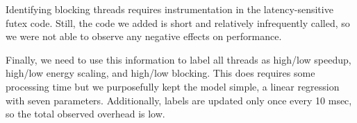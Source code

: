 Identifying blocking threads requires instrumentation in the latency-sensitive futex code. Still, the code we added is short and relatively infrequently called, so we were not able to observe any negative effects on performance. 

Finally, we need to use this information to label all threads as high/low speedup, high/low energy scaling, and high/low blocking. This does requires some processing time but we purposefully kept the model simple, a linear regression with seven parameters. Additionally, labels are updated only once every 10 msec, so the total observed overhead is low. 

